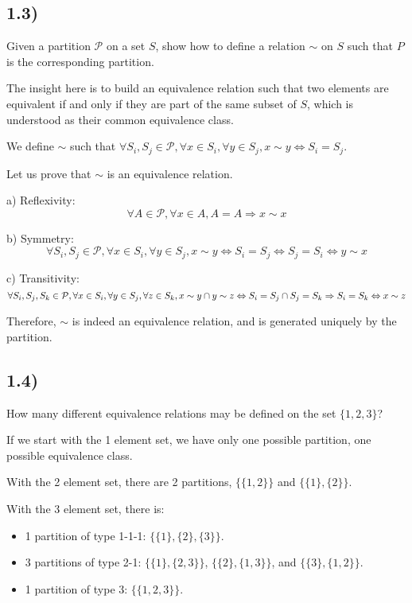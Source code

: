 \documentclass[12pt, letterpaper, twoside]{report}
\begin{document}
\subsection*{1.3)}

Given a partition $\mathcal{P}$ on a set $S$, show how to define a relation $\sim$ on $S$ such that $P$ is the corresponding partition.

The insight here is to build an equivalence relation such that two elements are equivalent if and only if they are part of the same subset of $S$, which is understood as their common equivalence class.

We define $\sim$ such that $\forall S_i, S_j \in \mathcal{P}, \forall x \in S_i, \forall y \in S_j, x \sim y \Leftrightarrow S_i = S_j$.

Let us prove that $\sim$ is an equivalence relation.

a) Reflexivity:
$$\forall A \in \mathcal{P}, \forall x \in A, A = A \Rightarrow x \sim x$$

b) Symmetry:
$$\forall S_i, S_j \in \mathcal{P}, \forall x \in S_i, \forall y \in S_j, x \sim y \Leftrightarrow S_i = S_j \Leftrightarrow S_j = S_i \Leftrightarrow y \sim x$$

c) Transitivity:
$$
\forall S_i, S_j, S_k \in \mathcal{P}, \forall x \in S_i, \forall y \in S_j, \forall z \in S_k, x \sim y \cap y \sim z \\
	\Leftrightarrow \\
S_i = S_j \cap S_j = S_k \Rightarrow S_i = S_k \\
	\Leftrightarrow \\
x \sim z
$$

Therefore, $\sim$ is indeed an equivalence relation, and is generated uniquely by the partition.



\subsection*{1.4)}

How many different equivalence relations may be defined on the set $\{1, 2, 3\}$?

If we start with the 1 element set, we have only one possible partition, one possible equivalence class.

With the 2 element set, there are 2 partitions, $\{\{1, 2\}\}$ and $\{\{1\}, \{2\}\}$.

With the 3 element set, there is:
\begin{itemize}
	\item 1 partition of type 1-1-1: $\{\{1\}, \{2\}, \{3\}\}$.
	\item 3 partitions of type 2-1: $\{\{1\}, \{2, 3\}\}$, $\{\{2\}, \{1, 3\}\}$, and $\{\{3\}, \{1, 2\}\}$.
	\item 1 partition of type 3: $\{\{1, 2, 3\}\}$.
\end{itemize}
\end{document}
